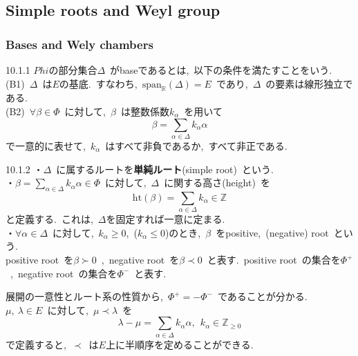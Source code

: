 \documentclass[uplatex,dvipdfmx]{jsarticle}
\begin{document}
\subsection{Simple roots and Weyl group}
\subsubsection{Bases and Wely chambers}
\begin{mydef}{10.1.1}
    $Phi$の部分集合$\Delta$~がbaseであるとは,~以下の条件を満たすことをいう.\\
    (B1)~$\Delta$~は$E$の基底.~すなわち,~$\text{span}_\mathbb{R}(\Delta) = E$~であり,~$\Delta$~の要素は線形独立である.\\
    (B2)~$\forall \beta \in \Phi$~に対して,~$\beta$~は整数係数$k_\alpha$~を用いて
    \begin{equation*}
        \beta = \sum_{\alpha \in \Delta} k_\alpha \alpha
    \end{equation*}
    で一意的に表せて,~$k_\alpha$~はすべて非負であるか,~すべて非正である.
\end{mydef}
\begin{mydef}{10.1.2}
    ・$\Delta$~に属するルートを\textbf{単純ルート}(simple root)~という.\\
    ・$\beta = \sum_{\alpha \in \Delta} k_\alpha \alpha \in \Phi$~に対して,~$\Delta$~に関する高さ(height)~を
    \begin{equation*}
        \text{ht}(\beta) = \sum_{\alpha \in \Delta} k_\alpha \in \mathbb{Z}
    \end{equation*}
    と定義する.~これは,~$\Delta$を固定すれば一意に定まる.\\
    ・$\forall \alpha \in \Delta$~に対して,~$k_\alpha \geq 0$,~($k_\alpha \leq 0$)のとき,~$\beta$~をpositive,~(negative) root~という.\\
    positive root~を$\beta \succ 0$~,~negative root~を$\beta \prec 0$~と表す.~positive root~の集合を$\Phi^+$~,~negative root~の集合を$\Phi^-$~と表す.
\end{mydef}
展開の一意性とルート系の性質から,~$\Phi^+ = -\Phi^-$~であることが分かる.\\
$\mu,~\lambda \in E$~に対して,~$\mu \prec \lambda$~を
\begin{equation*}
    \lambda - \mu = \sum_{\alpha \in \Delta} k_\alpha \alpha,~~k_\alpha \in \mathbb{Z}_{\geq 0}
\end{equation*}
で定義すると,~$\prec$~は$E$上に半順序を定めることができる.\\
\end{document}
